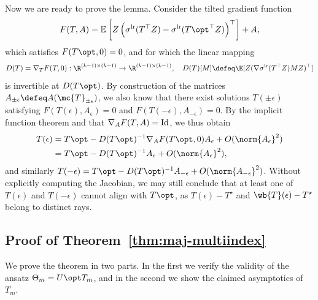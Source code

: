 \documentclass[11pt]{article}
\newcommand{\Ep}{\mathbb{E}}
\newcommand{\prn}[1]{\left({#1}\right)} %
\newcommand{\brk}[1]{\left[{#1}\right]} %
\newcommand{\lr}{^{\textup{lr}}}  %
\begin{document}
Now we are ready to prove the lemma.
%
Consider the tilted gradient function
\begin{align*}
  F(T,A) = \Ep \brk{Z \prn{ \sigma\lr(T^\top Z)
      - \sigma\lr({T\opt}^\top Z)}^\top} + A,
\end{align*}
which satisfies $F(T\opt, 0)= 0$, and for which the linear mapping
\begin{equation*}
  D(T) =
  \nabla_T F(T, 0) : \R^{(k-1) \times (k-1)} \to \R^{(k - 1) \times (k - 1)},
  ~~~
  D(T)[M] \defeq \E[Z (\nabla \sigma\lr(T^\top Z) M Z)^\top]
\end{equation*}
is invertible at $D(T\opt)$.
%
By construction of the matrices
$A_{\pm \epsilon} \defeq A(\mc{T}_{\pm \epsilon})$,
we also know that
there exist solutions $T(\pm \epsilon)$ satisfying
$F(T(\epsilon), A_\epsilon) = 0$ and
$F(T(-\epsilon), A_{-\epsilon}) = 0$.
%
By the implicit function theorem and that $\nabla_A F(T, A) = \textup{Id}$,
we thus obtain
\begin{align*}
  T(\epsilon) & = T\opt - D(T\opt)^{-1} \nabla_A F(T\opt, 0)
  A_\epsilon + O(\norm{A_\epsilon}^2) \\
  & = T\opt - D(T\opt)^{-1} A_\epsilon + O(\norm{A_\epsilon}^2),
\end{align*}
and similarly $T(-\epsilon) = T\opt - D(T\opt)^{-1} A_{-\epsilon} +
O(\norm{A_{-\epsilon}}^2)$.
%
Without explicitly computing the Jacobian, we may still conclude that at
least one of $T(\epsilon)$ and $T(-\epsilon)$ cannot align with $T\opt$, as
$T(\epsilon) - T^\star$ and $\wb{T}(\epsilon) - T^\star$ belong to distinct
rays.

\subsection{Proof of Theorem~\ref{thm:maj-multiindex}}
\label{proof:maj-multiindex}

We prove the theorem in two parts. In the first we verify the validity of
the ansatz $\Theta_m = U\opt T_m$, and in the second we show the claimed
asymptotics of $T_m$.
\end{document}
